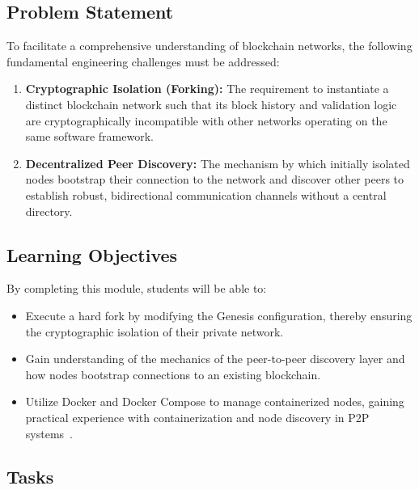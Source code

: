\subsection{Problem Statement}
To facilitate a comprehensive understanding of blockchain networks, the following fundamental engineering challenges must be addressed:

\begin{enumerate}
    \item \textbf{Cryptographic Isolation (Forking):} The requirement to instantiate a distinct blockchain network such that its block history and validation logic are cryptographically incompatible with other networks operating on the same software framework.
    
    \item \textbf{Decentralized Peer Discovery:} The mechanism by which initially isolated nodes bootstrap their connection to the network and discover other peers to establish robust, bidirectional communication channels without a central directory.
\end{enumerate}

\subsection{Learning Objectives}
By completing this module, students will be able to:
\begin{itemize}
    \item Execute a hard fork by modifying the Genesis configuration, thereby ensuring the cryptographic isolation of their private network.
    \item Gain understanding of the mechanics of the peer-to-peer discovery layer and how nodes bootstrap connections to an existing blockchain.
    \item Utilize Docker and Docker Compose to manage containerized nodes, gaining practical experience with containerization and node discovery in P2P systems~\cite{docker}.
\end{itemize}

\newpage

\subsection{Tasks}

